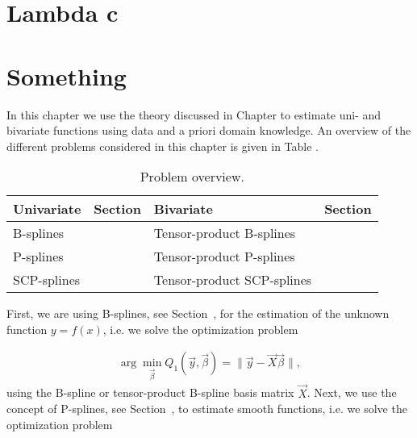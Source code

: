 \section{Lambda c} \label{sec:lambda_c_sec}


\section{Something}
In this chapter we use the theory discussed in Chapter  to estimate uni- and bivariate  functions using data and a priori domain knowledge. An overview of the different problems considered in this chapter is given in Table . 

\begin{table}[H]
	\centering
	\begin{tabular}{|l|l|l|l|}
		\hline
		\textbf{Univariate}   & \textbf{Section} & \textbf{Bivariate}         & \textbf{Section} \\ \hline \toprule
		B-splines             &                & Tensor-product B-splines   &               \\ \hline
		P-splines             &                & Tensor-product P-splines   &              \\ \hline
		SCP-splines           & 			   & Tensor-product SCP-splines &     \\ \hline \bottomrule
	\end{tabular}
	\caption{Problem overview.}
	\label{tab:problem_overview}
\end{table}
%
First, we are using B-splines, see Section~, for the estimation of the unknown function $y = f(x)$, i.e. we solve the optimization problem

\begin{align} \label{eq:OF-B-splines}
	\arg \min_{\vec{\beta}} Q_1(\vec{y}, \vec{\beta}) = \lVert \vec{y} - \vec{X} \vec{\beta} \rVert,
\end{align}
%
using the B-spline or tensor-product B-spline basis matrix $\vec{X}$. Next, we use the concept of P-splines, see Section~, to estimate smooth functions, i.e. we solve the optimization problem

